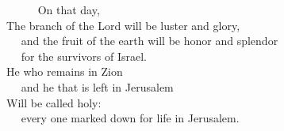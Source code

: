 
\lettrine{ }{}     On that day,\\
The branch of the Lord will be luster and glory,\\
   and the fruit of the earth will be honor and splendor\\
   for the survivors of Israel.\\
He who remains in Zion\\
   and he that is left in Jerusalem\\
Will be called holy:\\
   every one marked down for life in Jerusalem.